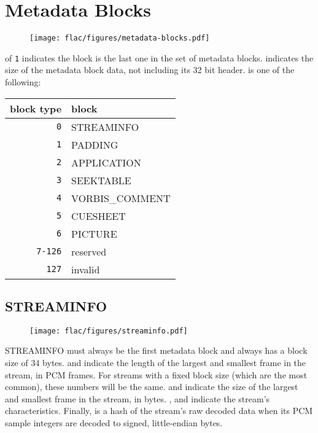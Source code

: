 
\section{Metadata Blocks}
\begin{figure}[h]
  \texttt{[image: flac/figures/metadata-blocks.pdf]}
\end{figure}
\par
\noindent
{} of \texttt{1} indicates the block is the last one
in the set of metadata blocks.
 indicates the size of the metadata block data,
not including its 32 bit header.
 is one of the following:
\begin{table}[h]
\begin{tabular}{r | l}
  block type & block \\
  \hline
  \texttt{0} & STREAMINFO \\
  \texttt{1} & PADDING \\
  \texttt{2} & APPLICATION \\
  \texttt{3} & SEEKTABLE \\
  \texttt{4} & VORBIS\_COMMENT \\
  \texttt{5} & CUESHEET \\
  \texttt{6} & PICTURE \\
  \texttt{7-126} & reserved \\
  \texttt{127} & invalid \\
\end{tabular}
\end{table}

\clearpage

\subsection{STREAMINFO}
\begin{figure}[h]
\texttt{[image: flac/figures/streaminfo.pdf]}
\end{figure}
\par
\noindent
STREAMINFO must always be the first metadata block and always
has a block size of 34 bytes.
 and 
indicate the length of the largest and smallest
frame in the stream, in PCM frames.
For streams with a fixed block size (which are the most common),
these numbers will be the same.
 and 
indicate the size of the largest and smallest frame in the stream,
in bytes.
,  and 
indicate the stream's characteristics.
Finally,  is a hash of the stream's raw decoded data
when its PCM sample integers are decoded to signed, little-endian bytes.

